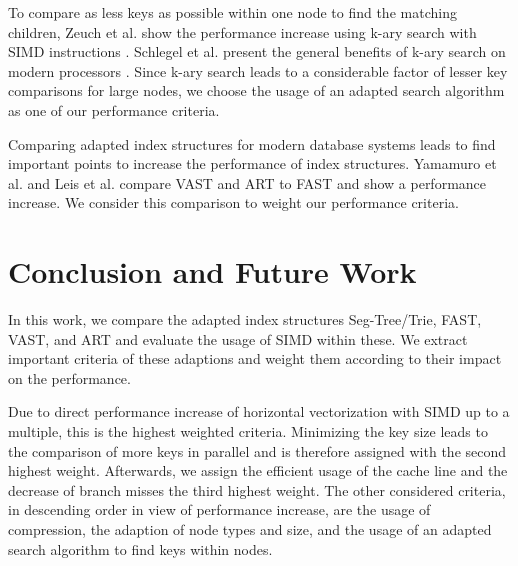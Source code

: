 \documentclass[runningheads,a4paper]{llncs}
\begin{document}
To compare as less keys as possible within one node to find the matching children, Zeuch et al. show the performance increase using k-ary search with SIMD instructions \cite{zeuch2014adapting}. Schlegel et al. present the general benefits of k-ary search on modern processors \cite{schlegel2009k}. Since k-ary search leads to a considerable factor of lesser key comparisons for large nodes, we choose the usage of an adapted search algorithm as one of our performance criteria.

Comparing adapted index structures for modern database systems leads to find important points to increase the performance of index structures. Yamamuro et al. and Leis et al. compare VAST \cite{yamamuro2012vast} and ART \cite{leis2013adaptive} to FAST and show a performance increase. We consider this comparison to weight our performance criteria.

\section{Conclusion and Future Work}


In this work, we compare the adapted index structures Seg-Tree/Trie, FAST, VAST, and ART and evaluate the usage of SIMD within these. We extract important criteria of these adaptions and weight them according to their impact on the performance.

Due to direct performance increase of horizontal vectorization with SIMD up to a multiple, this is the highest weighted criteria. Minimizing the key size leads to the comparison of more keys in parallel and is therefore assigned with the second highest weight. Afterwards, we assign the efficient usage of the cache line and the decrease of branch misses the third highest weight. The other considered criteria, in descending order in view of performance increase, are the usage of compression, the adaption of node types and size, and the usage of an adapted search algorithm to find keys within nodes. 
\end{document}
